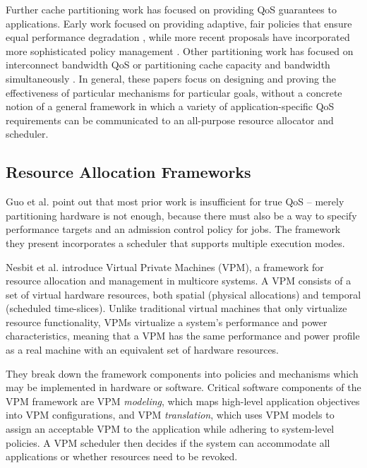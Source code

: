 Further cache partitioning work has focused on providing QoS guarantees to applications. Early work focused on providing adaptive, fair policies that ensure equal performance degradation \cite{605420,1086328}, while more recent proposals have incorporated more sophisticated policy management \cite{1241608,1331730,1152161,1254886}. Other partitioning work has focused on interconnect bandwidth QoS \cite{1382130} or partitioning cache capacity and bandwidth simultaneously \cite{1250671}. In general, these papers focus on designing and proving the effectiveness of particular mechanisms for particular goals, without a concrete notion of a general framework in which a variety of application-specific QoS requirements can be communicated to an all-purpose resource allocator and scheduler.

\subsection{Resource Allocation Frameworks}

Guo et al. \cite{1331730} point out that most prior work is insufficient for true QoS -- merely partitioning hardware is not enough, because there must also be a way to specify performance targets and an admission control policy for jobs.
The framework they present incorporates a scheduler that supports multiple execution modes.

Nesbit et al. \cite{1436097} introduce Virtual Private Machines (VPM), a framework for resource allocation and management in multicore systems. A VPM consists of a set of virtual hardware resources, both spatial (physical allocations) and temporal (scheduled time-slices).  Unlike traditional virtual machines that only virtualize resource functionality, VPMs virtualize a system's performance and power characteristics, meaning that a VPM has the same performance and power profile as a real machine with an equivalent set of hardware resources.

They break down the framework components into policies and mechanisms which may be implemented in hardware or software. Critical software components of the VPM framework are VPM {\em modeling}, which maps high-level application objectives into VPM configurations, and VPM {\em translation}, which uses VPM models to assign an acceptable VPM to the application while adhering to system-level policies. A VPM scheduler then decides if the system can accommodate all applications or whether resources need to be revoked.

